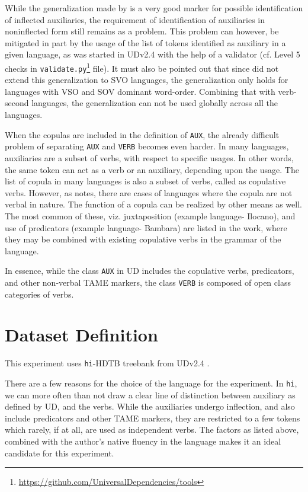 While the generalization made by \citeauthor{greenberg1963some} is a very good marker for possible identification of inflected auxiliaries, the requirement of identification of auxiliaries in noninflected form still remains as a problem. This problem can however, be mitigated in part by the usage of the list of tokens identified as auxiliary in a given language, as was started in UDv2.4 \citep{UDv2.4} with the help of a validator (cf. Level 5 checks in \verb|validate.py|\footnote{\url{https://github.com/UniversalDependencies/tools}} file). It must also be pointed out that since \citeauthor{greenberg1963some} did not extend this generalization to SVO languages, the generalization only holds for languages with VSO and SOV dominant word-order. Combining that with verb-second languages, the generalization can not be used globally across all the languages.

When the copulas are included in the definition of \verb|AUX|, the already difficult problem of separating \verb|AUX| and \verb|VERB| becomes even harder. In many languages, auxiliaries are a subset of verbs, with respect to specific usages. In other words, the same token can act as a verb or an auxiliary, depending upon the usage. The list of copula in many languages is also a subset of verbs, called as copulative verbs. However, as \citeauthor{langtypology} notes, there are cases of languages where the copula are not verbal in nature. The function of a copula can be realized by other means as well. The most common of these, viz. juxtaposition (example language- Ilocano), and use of predicators (example language- Bambara) are listed in the work, where they may be combined with existing copulative verbs in the grammar of the language.

In essence, while the class \verb|AUX| in UD includes the copulative verbs, predicators, and other non-verbal TAME markers, the class \verb|VERB| is composed of open class categories of verbs.

\section{Dataset Definition}
\label{ssec:auxverbDataset}

This experiment uses \verb|hi|-HDTB treebank from UDv2.4 \citep{UDv2.4}.

There are a few reasons for the choice of the language for the experiment. In \verb|hi|, we can more often than not draw a clear line of distinction between auxiliary as defined by UD, and the verbs. While the auxiliaries undergo inflection, and also include predicators and other TAME markers, they are restricted to a few tokens which rarely, if at all, are used as independent verbs. The factors as listed above, combined with the author's native fluency in the language makes it an ideal candidate for this experiment.

